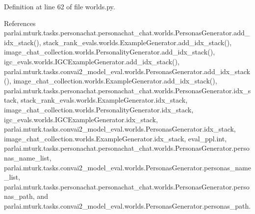 Definition at line 62 of file worlds.\+py.



References parlai.\+mturk.\+tasks.\+personachat.\+personachat\+\_\+chat.\+worlds.\+Personas\+Generator.\+add\+\_\+idx\+\_\+stack(), stack\+\_\+rank\+\_\+evals.\+worlds.\+Example\+Generator.\+add\+\_\+idx\+\_\+stack(), image\+\_\+chat\+\_\+collection.\+worlds.\+Personality\+Generator.\+add\+\_\+idx\+\_\+stack(), igc\+\_\+evals.\+worlds.\+I\+G\+C\+Example\+Generator.\+add\+\_\+idx\+\_\+stack(), parlai.\+mturk.\+tasks.\+convai2\+\_\+model\+\_\+eval.\+worlds.\+Personas\+Generator.\+add\+\_\+idx\+\_\+stack(), image\+\_\+chat\+\_\+collection.\+worlds.\+Example\+Generator.\+add\+\_\+idx\+\_\+stack(), parlai.\+mturk.\+tasks.\+personachat.\+personachat\+\_\+chat.\+worlds.\+Personas\+Generator.\+idx\+\_\+stack, stack\+\_\+rank\+\_\+evals.\+worlds.\+Example\+Generator.\+idx\+\_\+stack, image\+\_\+chat\+\_\+collection.\+worlds.\+Personality\+Generator.\+idx\+\_\+stack, igc\+\_\+evals.\+worlds.\+I\+G\+C\+Example\+Generator.\+idx\+\_\+stack, parlai.\+mturk.\+tasks.\+convai2\+\_\+model\+\_\+eval.\+worlds.\+Personas\+Generator.\+idx\+\_\+stack, image\+\_\+chat\+\_\+collection.\+worlds.\+Example\+Generator.\+idx\+\_\+stack, eval\+\_\+ppl.\+int, parlai.\+mturk.\+tasks.\+personachat.\+personachat\+\_\+chat.\+worlds.\+Personas\+Generator.\+personas\+\_\+name\+\_\+list, parlai.\+mturk.\+tasks.\+convai2\+\_\+model\+\_\+eval.\+worlds.\+Personas\+Generator.\+personas\+\_\+name\+\_\+list, parlai.\+mturk.\+tasks.\+personachat.\+personachat\+\_\+chat.\+worlds.\+Personas\+Generator.\+personas\+\_\+path, and parlai.\+mturk.\+tasks.\+convai2\+\_\+model\+\_\+eval.\+worlds.\+Personas\+Generator.\+personas\+\_\+path.

